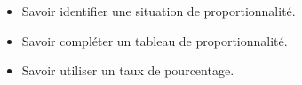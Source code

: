 \begin{myobj}
	\begin{itemize}
		\item Savoir identifier une situation de proportionnalité.
		\item Savoir compléter un tableau de proportionnalité.
		\item Savoir utiliser un taux de pourcentage.
	\end{itemize}
\end{myobj}

%
%		


